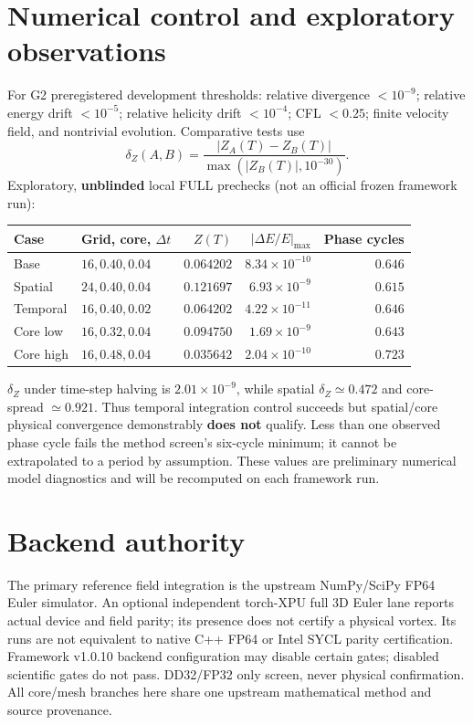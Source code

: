 \documentclass[11pt,a4paper]{article}
\begin{document}
\section{Numerical control and exploratory observations}
For G2 preregistered development thresholds: relative divergence $<10^{-9}$; relative energy drift $<10^{-5}$; relative helicity drift $<10^{-4}$; CFL $<0.25$; finite velocity field, and nontrivial evolution. Comparative tests use
\begin{equation}\delta_Z(A,B)=\frac{|Z_A(T)-Z_B(T)|}{\max(|Z_B(T)|,10^{-30})}.\end{equation}
Exploratory, \textbf{unblinded} local FULL prechecks (not an official frozen framework run):
\begin{center}\begin{tabular}{llrrr}\toprule
Case & Grid, core, $\Delta t$ & $Z(T)$ & $|\Delta E/E|_{\max}$ & Phase cycles\\\midrule
Base & $16,0.40,0.04$ & $0.064202$ & $8.34\times10^{-10}$ & $0.646$\\
Spatial & $24,0.40,0.04$ & $0.121697$ & $6.93\times10^{-9}$ & $0.615$\\
Temporal & $16,0.40,0.02$ & $0.064202$ & $4.22\times10^{-11}$ & $0.646$\\
Core low & $16,0.32,0.04$ & $0.094750$ & $1.69\times10^{-9}$ & $0.643$\\
Core high & $16,0.48,0.04$ & $0.035642$ & $2.04\times10^{-10}$ & $0.723$\\\bottomrule\end{tabular}\end{center}
$\delta_Z$ under time-step halving is $2.01\times10^{-9}$, while spatial $\delta_Z\simeq0.472$ and core-spread $\simeq0.921$. Thus temporal integration control succeeds but spatial/core physical convergence demonstrably \textbf{does not} qualify. Less than one observed phase cycle fails the method screen's six-cycle minimum; it cannot be extrapolated to a period by assumption. These values are preliminary numerical model diagnostics and will be recomputed on each framework run.

\section{Backend authority}
The primary reference field integration is the upstream NumPy/SciPy FP64 Euler simulator. An optional independent torch-XPU full 3D Euler lane reports actual device and field parity; its presence does not certify a physical vortex. Its runs are not equivalent to native C++ FP64 or Intel SYCL parity certification. Framework v1.0.10 backend configuration may disable certain gates; disabled scientific gates do not pass. DD32/FP32 only screen, never physical confirmation. All core/mesh branches here share one upstream mathematical method and source provenance.
\end{document}

